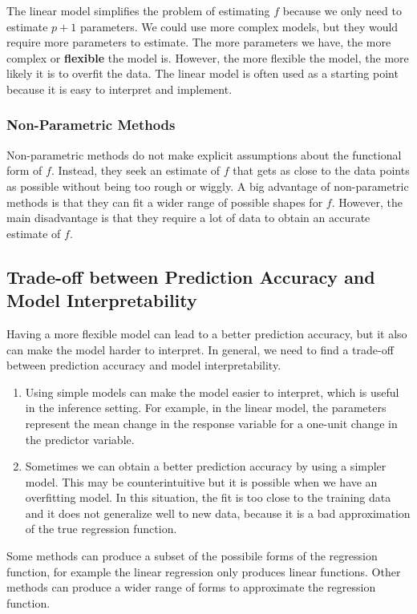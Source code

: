 The linear model simplifies the problem of estimating $f$ because we only need to estimate $p+1$ parameters. We could use more complex models, but they would require more parameters to estimate. The more parameters we have, the more complex or \textbf{flexible} the model is. However, the more flexible the model, the more likely it is to overfit the data. The linear model is often used as a starting point because it is easy to interpret and implement. 

\subsubsection*{Non-Parametric Methods}
Non-parametric methods do not make explicit assumptions about the functional form of $f$. Instead, they seek an estimate of $f$ that gets as close to the data points as possible without being too rough or wiggly. A big advantage of non-parametric methods is that they can fit a wider range of possible shapes for $f$. However, the main disadvantage is that they require a lot of data to obtain an accurate estimate of $f$.

\subsection*{Trade-off between Prediction Accuracy and Model Interpretability}
Having a more flexible model can lead to a better prediction accuracy, but it also can make the model harder to interpret. In general, we need to find a trade-off between prediction accuracy and model interpretability.

\begin{enumerate}
    \item Using simple models can make the model easier to interpret, which is useful in the inference setting. For example, in the linear model, the parameters represent the mean change in the response variable for a one-unit change in the predictor variable.
    \item Sometimes we can obtain a better prediction accuracy by using a simpler model. This may be counterintuitive but it is possible when we have an overfitting model. In this situation, the fit is too close to the training data and it does not generalize well to new data, because it is a bad approximation of the true regression function.
\end{enumerate}

Some methods can produce a subset of the possibile forms of the regression function, for example the linear regression only produces linear functions. Other methods can produce a wider range of forms to approximate the regression function.


